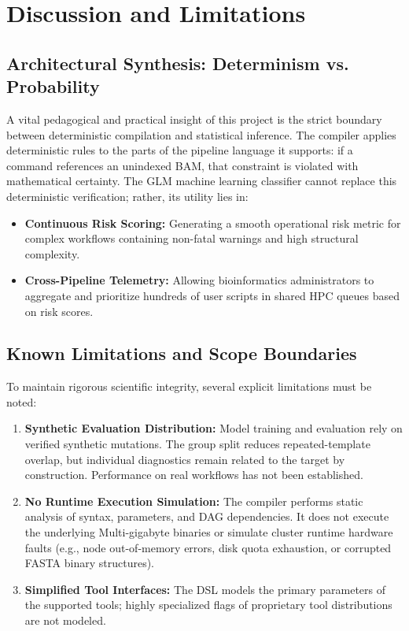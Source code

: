 \documentclass[12pt,a4paper]{article}
\begin{document}
\newpage

\section{Discussion and Limitations}

\subsection{Architectural Synthesis: Determinism vs. Probability}

A vital pedagogical and practical insight of this project is the strict boundary between deterministic compilation and statistical inference. The compiler applies deterministic rules to the parts of the pipeline language it supports: if a command references an unindexed BAM, that constraint is violated with mathematical certainty. The GLM machine learning classifier cannot replace this deterministic verification; rather, its utility lies in:
\begin{itemize}
    \item \textbf{Continuous Risk Scoring:} Generating a smooth operational risk metric for complex workflows containing non-fatal warnings and high structural complexity.
    \item \textbf{Cross-Pipeline Telemetry:} Allowing bioinformatics administrators to aggregate and prioritize hundreds of user scripts in shared HPC queues based on risk scores.
\end{itemize}

\subsection{Known Limitations and Scope Boundaries}

To maintain rigorous scientific integrity, several explicit limitations must be noted:
\begin{enumerate}
    \item \textbf{Synthetic Evaluation Distribution:} Model training and evaluation rely on verified synthetic mutations. The group split reduces repeated-template overlap, but individual diagnostics remain related to the target by construction. Performance on real workflows has not been established.
    \item \textbf{No Runtime Execution Simulation:} The compiler performs static analysis of syntax, parameters, and DAG dependencies. It does not execute the underlying Multi-gigabyte binaries or simulate cluster runtime hardware faults (e.g., node out-of-memory errors, disk quota exhaustion, or corrupted FASTA binary structures).
    \item \textbf{Simplified Tool Interfaces:} The DSL models the primary parameters of the supported tools; highly specialized flags of proprietary tool distributions are not modeled.
\end{enumerate}
\end{document}
